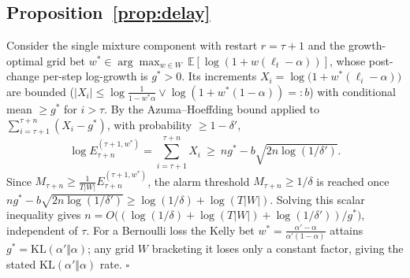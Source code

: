 \documentclass[sigconf,nonacm]{acmart}
\newcommand{\E}{\mathbb{E}}
\begin{document}
\subsection{Proposition~\ref{prop:delay}}
Consider the single mixture component with restart $r = \tau + 1$ and the
growth-optimal grid bet $w^\ast \in \arg\max_{w \in W}\,
\E[\log(1 + w(\ell_t - \alpha))]$, whose post-change per-step log-growth is
$g^\ast > 0$. Its increments
$X_i = \log\big(1 + w^\ast(\ell_i - \alpha)\big)$ are bounded
($|X_i| \le \log\frac{1}{1-w^\ast\alpha} \vee \log(1 + w^\ast(1-\alpha))
=: b$) with conditional mean $\ge g^\ast$ for $i > \tau$. By the
Azuma--Hoeffding bound applied to $\sum_{i=\tau+1}^{\tau+n}(X_i - g^\ast)$,
with probability $\ge 1 - \delta'$,
\[
\log E_{\tau+n}^{(\tau+1, w^\ast)}
= \sum_{i=\tau+1}^{\tau+n} X_i
\ \ge\ n g^\ast - b\sqrt{2 n \log(1/\delta')}.
\]
Since $M_{\tau+n} \ge \frac{1}{T|W|}E_{\tau+n}^{(\tau+1,w^\ast)}$, the alarm
threshold $M_{\tau+n} \ge 1/\delta$ is reached once
$n g^\ast - b\sqrt{2 n \log(1/\delta')} \ge \log(1/\delta) + \log(T|W|)$.
Solving this scalar inequality gives
$n = O\big((\log(1/\delta) + \log(T|W|) + \log(1/\delta'))/g^\ast\big)$,
independent of $\tau$. For a Bernoulli loss the Kelly bet
$w^\ast = \frac{\alpha'-\alpha}{\alpha'(1-\alpha)}$ attains
$g^\ast = \mathrm{KL}(\alpha' \Vert \alpha)$; any grid $W$ bracketing it
loses only a constant factor, giving the stated
$\mathrm{KL}(\alpha'\Vert\alpha)$ rate. \hfill$\square$
\end{document}

